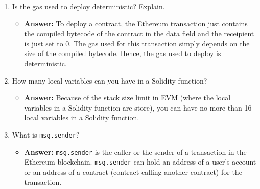 \documentclass[11pt]{article}
\begin{document}
\begin{enumerate}
	\item Is the gas used to deploy deterministic? Explain.
	\begin{itemize}
	    \item \textbf{Answer: } To deploy a contract, the Ethereum transaction just contains the compiled bytecode of the contract in the data field and the receipient is just set to $0$. The gas used for this transaction simply depends on the size of the compiled bytecode. Hence, the gas used to deploy is deterministic.
	\end{itemize}
	\item How many local variables can you have in a Solidity function?
    \begin{itemize}
        \item \textbf{Answer: } Because of the stack size limit in EVM (where the local variables in a Solidity function are store), you can have no more than 16 local variables in a Solidity function.
    \end{itemize}

	\item What is \texttt{msg.sender}? 
	\begin{itemize}
	    \item \textbf{Answer: } \texttt{msg.sender} is the caller or the sender of a transaction in the Ethereum blockchain. \texttt{msg.sender} can hold an address of a user's account or an address of a contract (contract calling another contract) for the transaction.
	\end{itemize}
	

\end{enumerate}
\end{document}

